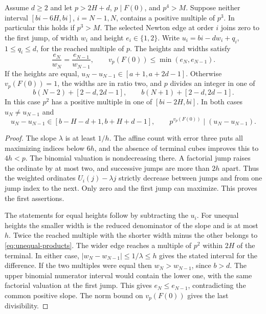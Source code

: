 \begin{lemma}\label{lem:two-heights}
Assume \(d\ge2\) and let \(p>2H+d\), \(p\mid F(0)\), and
\(p^4>M\). Suppose neither
interval \([bi-6H,bi]\), \(i=N-1,N\), contains a positive
multiple of \(p^3\). In particular this holds if \(p^3>M\).
The selected Newton edge at order \(i\) joins zero to the first
jump, of width \(w_i\) and height \(e_i\in\{1,2\}\).
Write \(u_i=bi-dw_i+q_i\), \(1\le q_i\le d\), for the reached
multiple of \(p\). The heights and widths satisfy
\[
 \frac{e_N}{w_N}=\frac{e_{N-1}}{w_{N-1}},\qquad
 v_p(F(0))\le\min(e_N,e_{N-1}).
\]
If the heights are equal, \(u_N-u_{N-1}\in[a+1,a+2d-1]\).
Otherwise \(v_p(F(0))=1\), the widths are in ratio two,
and \(p\) divides an integer in one of
\begin{equation}\label{eq:unequal-products}
 b(N-2)+[2-d,2d-1],\qquad b(N+1)+[2-d,2d-1].
\end{equation}
In this case \(p^2\) has a positive multiple in one of
\([bi-2H,bi]\). In both cases \(u_N\ne u_{N-1}\) and
\[
 u_N-u_{N-1}\in[b-H-d+1,b+H+d-1],
 \qquad p^{v_p(F(0))}\mid (u_N-u_{N-1}).
\]
\end{lemma}

\begin{proof}
The slope \(\lambda\) is at least \(1/h\). The affine
count with error three puts all maximizing indices below
\(6h\), and the absence of terminal cubes improves this to
\(4h<p\). The binomial valuation is nondecreasing there.
A factorial jump raises the ordinate by at most two, and
successive jumps are more than \(2h\) apart. Thus the
weighted ordinates \(U_i(j)-\lambda j\) strictly decrease
between jumps and from one jump index to the next. Only zero
and the first jump can maximize. This proves the first assertions.

The statements for equal heights follow by subtracting the
\(u_i\). For unequal heights the smaller width is the reduced
denominator of the slope and is at most \(h\). Twice the
reached multiple with the shorter width minus the other
belongs to \eqref{eq:unequal-products}. The wider edge
reaches a multiple of \(p^2\) within \(2H\) of the terminal.
In either case, \(|w_N-w_{N-1}|\le1/\lambda\le h\)
gives the stated interval for the difference. If the two
multiples were equal then \(w_N>w_{N-1}\), since \(b>d\).
The upper binomial numerator interval would contain the
lower one, with the same factorial valuation at the first
jump. This gives \(e_N\le e_{N-1}\), contradicting the common
positive slope. The norm bound on \(v_p(F(0))\) gives the last
divisibility.
\end{proof}

